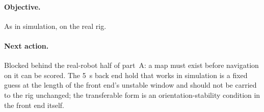 \documentclass[11pt,a4paper,notitlepage]{report}
\begin{document}

\paragraph{Objective.} As in simulation, on the real rig.

\paragraph{Next action.} Blocked behind the real-robot half of part~A: a
map must exist before navigation on it can be scored. The \SI{5}{\second} back
end hold that works in simulation is a fixed guess at the length of the front
end's unstable window and should not be carried to the rig unchanged; the
transferable form is an orientation-stability condition in the front end
itself.
\end{document}
